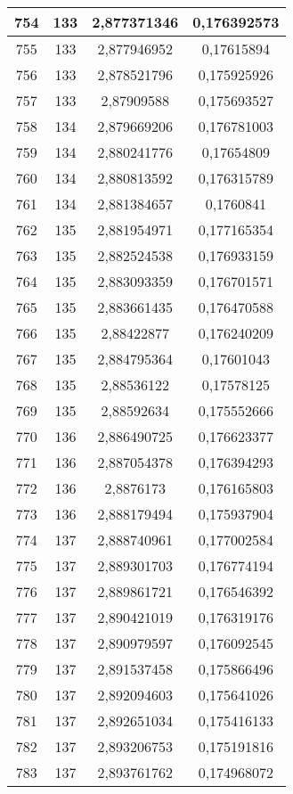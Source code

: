 {\begin{minipage}[!h]{0.45\textwidth}
\begin{longtable}{cccc}
754 & 133 & 2,877371346 & 0,176392573 \\ \hline
755 & 133 & 2,877946952 & 0,17615894 \\ \hline
756 & 133 & 2,878521796 & 0,175925926 \\ \hline
757 & 133 & 2,87909588 & 0,175693527 \\ \hline
758 & 134 & 2,879669206 & 0,176781003 \\ \hline
759 & 134 & 2,880241776 & 0,17654809 \\ \hline
760 & 134 & 2,880813592 & 0,176315789 \\ \hline
761 & 134 & 2,881384657 & 0,1760841 \\ \hline
762 & 135 & 2,881954971 & 0,177165354 \\ \hline
763 & 135 & 2,882524538 & 0,176933159 \\ \hline
764 & 135 & 2,883093359 & 0,176701571 \\ \hline
765 & 135 & 2,883661435 & 0,176470588 \\ \hline
766 & 135 & 2,88422877 & 0,176240209 \\ \hline
767 & 135 & 2,884795364 & 0,17601043 \\ \hline
768 & 135 & 2,88536122 & 0,17578125 \\ \hline
769 & 135 & 2,88592634 & 0,175552666 \\ \hline
770 & 136 & 2,886490725 & 0,176623377 \\ \hline
771 & 136 & 2,887054378 & 0,176394293 \\ \hline
772 & 136 & 2,8876173 & 0,176165803 \\ \hline
773 & 136 & 2,888179494 & 0,175937904 \\ \hline
774 & 137 & 2,888740961 & 0,177002584 \\ \hline
775 & 137 & 2,889301703 & 0,176774194 \\ \hline
776 & 137 & 2,889861721 & 0,176546392 \\ \hline
777 & 137 & 2,890421019 & 0,176319176 \\ \hline
778 & 137 & 2,890979597 & 0,176092545 \\ \hline
779 & 137 & 2,891537458 & 0,175866496 \\ \hline
780 & 137 & 2,892094603 & 0,175641026 \\ \hline
781 & 137 & 2,892651034 & 0,175416133 \\ \hline
782 & 137 & 2,893206753 & 0,175191816 \\ \hline
783 & 137 & 2,893761762 & 0,174968072 \\ \hline

\end{longtable}
\end{minipage}}
